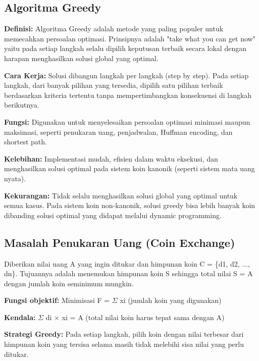\subsection{Algoritma Greedy}
\textbf{Definisi:} Algoritma Greedy adalah metode yang paling populer untuk memecahkan persoalan optimasi. Prinsipnya adalah "take what you can get now" yaitu pada setiap langkah selalu dipilih keputusan terbaik secara lokal dengan harapan menghasilkan solusi global yang optimal.

\textbf{Cara Kerja:} Solusi dibangun langkah per langkah (step by step). Pada setiap langkah, dari banyak pilihan yang tersedia, dipilih satu pilihan terbaik berdasarkan kriteria tertentu tanpa mempertimbangkan konsekuensi di langkah berikutnya.

\textbf{Fungsi:} Digunakan untuk menyelesaikan persoalan optimasi minimasi maupun maksimasi, seperti penukaran uang, penjadwalan, Huffman encoding, dan shortest path.

\textbf{Kelebihan:} Implementasi mudah, efisien dalam waktu eksekusi, dan menghasilkan solusi optimal pada sistem koin kanonik (seperti sistem mata uang nyata).

\textbf{Kekurangan:} Tidak selalu menghasilkan solusi global yang optimal untuk semua kasus. Pada sistem koin non-kanonik, solusi greedy bisa lebih banyak koin dibanding solusi optimal yang didapat melalui dynamic programming.

\subsection{Masalah Penukaran Uang (Coin Exchange)}
Diberikan nilai uang A yang ingin ditukar dan himpunan koin C = \{d1, d2, ..., dn\}. Tujuannya adalah menemukan himpunan koin S sehingga total nilai S = A dengan jumlah koin seminimum mungkin.

\textbf{Fungsi objektif:} Minimisasi F = $\Sigma$ xi (jumlah koin yang digunakan)

\textbf{Kendala:} $\Sigma$ di $\times$ xi = A (total nilai koin harus tepat sama dengan A)

\textbf{Strategi Greedy:} Pada setiap langkah, pilih koin dengan nilai terbesar dari himpunan koin yang tersisa selama masih tidak melebihi sisa nilai yang perlu ditukar.